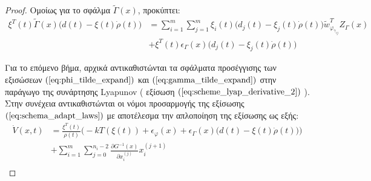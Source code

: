 \begin{proof}
Ομοίως για το σφάλμα $\tilde{\Gamma}(x)$, προκύπτει:
\begin{equation}
\begin{split}
	\xi^T(t) \tilde{\Gamma}(x) \big( d(t) - \xi(t)\dot{\rho}(t) \big) 
	&= \sum_{i=1}^{m} \sum_{j=1}^{m}
	\xi_i(t) \big( d_j(t) - \xi_j(t)\dot{\rho}(t) \big)  \tilde{w}_{\varphi_{\gamma_{ij}}}^{T} Z_{\Gamma}(x) \\
	&+\xi^T(t) \epsilon_{\Gamma}(x)  \big( d_j(t) - \xi_j(t)\dot{\rho}(t) \big)
\end{split}
\label{eq:gamma_tilde_expand}
\end{equation}

Για το επόμενο βήμα,  αρχικά αντικαθιστώνται τα σφάλματα προσέγγισης των εξισώσεων $(\ref{eq:phi_tilde_expand})$ και $(\ref{eq:gamma_tilde_expand})$ στην παράγωγο της συνάρτησης Lyapunov ( εξίσωση $(\ref{eq:scheme_lyap_derivative_2})$ ). Στην συνέχεια αντικαθιστώνται οι νόμοι προσαρμογής της εξίσωσης $(\ref{eq:schema_adapt_laws})$ με αποτέλεσμα την απλοποίηση της εξίσωσης ως εξής:
\begin{equation}
\begin{split}
\dot{V}(x,t) &= 
\frac{\xi^T(t)} {\rho(t)} \Big( -k T(\xi(t)) + \epsilon_{\varphi}(x)  
+  \epsilon_{\Gamma}(x) \big( d(t) - \xi(t)\dot{\rho}(t) \big)  \Big) \\ 
&+ \sum_{i=1}^{m} \sum_{j=0}^{n_i - 2} 
\frac{\partial G^{-1}(x) }{\partial x_i^{(j)}} x_i^{(j +1)}\\
\end{split}
\label{eq:scheme_lyap_derivative_3}
\end{equation}


\end{proof}
